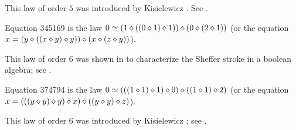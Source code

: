 This law of order $5$ was introduced by Kisielewicz \cite{Kisielewicz}. See .

\begin{definition}[Equation 345169]
  \label{eq345169}
  Equation 345169 is the law $0  \simeq  (1 \diamond ((0 \diamond 1) \diamond 1)) \diamond (0 \diamond (2 \diamond 1))$ (or the equation $x = (y \diamond ((x \diamond y) \diamond y)) \diamond (x \diamond (z \diamond y))$).
\end{definition}

This law of order $6$ was shown in \cite{mccune_et_al} to characterize the Sheffer stroke in a boolean algebra; see .

\begin{definition}[Equation 374794]
  \leanok
  \label{eq374794}
  Equation 374794 is the law $0  \simeq  (((1 \diamond 1) \diamond 1) \diamond 0) \diamond ((1 \diamond 1) \diamond 2)$ (or the equation $x = (((y \diamond y) \diamond y) \diamond x) \diamond ((y \diamond y) \diamond z)$).
\end{definition}

This law of order $6$ was introduced by Kisielewicz \cite{Kisielewicz}; see .
